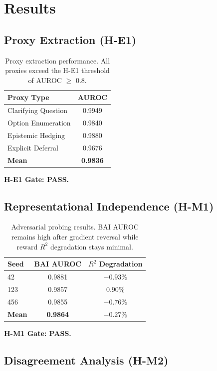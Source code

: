 \section{Results}

\subsection{Proxy Extraction (H-E1)}

\begin{table}[h]
\centering
\begin{tabular}{lc}
\toprule
Proxy Type & AUROC \\
\midrule
Clarifying Question & 0.9949 \\
Option Enumeration & 0.9840 \\
Epistemic Hedging & 0.9880 \\
Explicit Deferral & 0.9676 \\
\midrule
\textbf{Mean} & \textbf{0.9836} \\
\bottomrule
\end{tabular}
\caption{Proxy extraction performance. All proxies exceed the H-E1 threshold of AUROC $\geq$ 0.8.}
\label{tab:proxy}
\end{table}

\textbf{H-E1 Gate: PASS.}

\subsection{Representational Independence (H-M1)}

\begin{table}[h]
\centering
\begin{tabular}{lcc}
\toprule
Seed & BAI AUROC & $R^2$ Degradation \\
\midrule
42 & 0.9881 & $-0.93\%$ \\
123 & 0.9857 & $0.90\%$ \\
456 & 0.9855 & $-0.76\%$ \\
\midrule
\textbf{Mean} & \textbf{0.9864} & \textbf{$-0.27\%$} \\
\bottomrule
\end{tabular}
\caption{Adversarial probing results. BAI AUROC remains high after gradient reversal while reward $R^2$ degradation stays minimal.}
\label{tab:adversarial}
\end{table}

\textbf{H-M1 Gate: PASS.}

\subsection{Disagreement Analysis (H-M2)}

